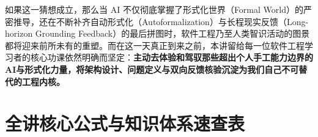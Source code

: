 \documentclass[a4paper]{article}
\begin{document}
如果这一猜想成立，那么当 AI 不仅彻底掌握了形式化世界（Formal World）的严密推导，还在不断补齐自动形式化（Autoformalization）与长程现实反馈（Long-horizon Grounding Feedback）的最后拼图时，软件工程乃至人类智识活动的图景都将迎来前所未有的重塑。而在这一天真正到来之前，本讲留给每一位软件工程学习者的核心功课依然明确而坚定：\textbf{主动去体验和驾驭那些超出个人手工能力边界的AI与形式化力量，将架构设计、问题定义与双向反馈核验沉淀为我们自己不可替代的工程内核。}

\newpage
\section*{全讲核心公式与知识体系速查表}
\end{document}
